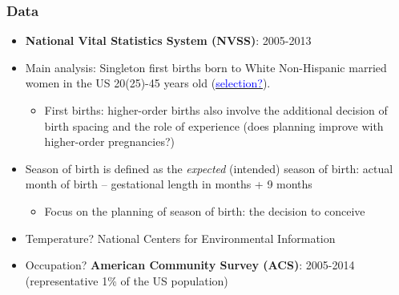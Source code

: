 \documentclass[10pt,letterpaper,subeqn]{beamer}
\begin{document}
\begin{frame}[label=Data]
\frametitle{Data}
\begin{itemize}
\item \textbf{National Vital Statistics System (NVSS)}: 2005-2013
\item Main analysis: Singleton first births born to White Non-Hispanic married women in the US 20(25)-45 years old (\hyperlink{ageHist}{\textcolor{blue}{selection?}}).
\begin{itemize}
\item First births: higher-order births also involve the additional decision of birth spacing and the role of experience (does planning improve with higher-order pregnancies?)
\end{itemize}
\item Season of birth is defined as the \emph{expected} (intended) season of birth: actual month of birth --  gestational length in months + 9 months
\begin{itemize}
\item Focus on the planning of season of birth: the decision to conceive
\end{itemize}
\item Temperature? National Centers for Environmental Information
\item Occupation? \textbf{American Community Survey (ACS)}: 2005-2014 (representative 1\% of the US population)
\end{itemize}
\end{frame}

\end{document}
